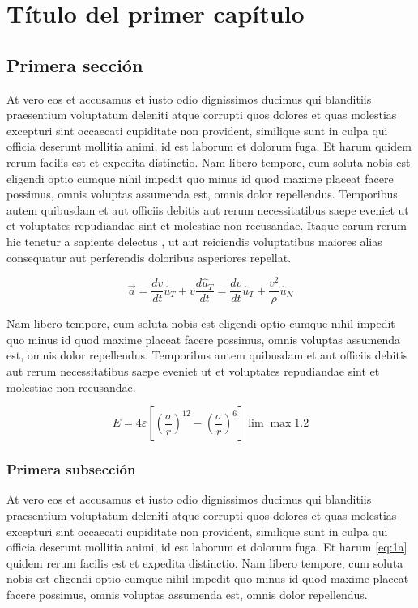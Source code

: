 \chapter{Título del primer capítulo}
\section{Primera sección}
At vero eos et accusamus et iusto odio dignissimos ducimus
qui blanditiis praesentium voluptatum deleniti atque corrupti
quos dolores et quas molestias excepturi sint occaecati cupiditate
non provident, similique sunt in culpa qui officia deserunt mollitia animi,
id est laborum et dolorum fuga. Et harum quidem rerum facilis est et expedita
distinctio. Nam libero tempore, cum soluta nobis est eligendi optio cumque
nihil impedit quo minus id quod maxime placeat facere possimus, omnis voluptas
assumenda est, omnis dolor repellendus. Temporibus autem \cite{Bellomo2000} quibusdam et aut
officiis debitis aut rerum necessitatibus saepe eveniet ut et voluptates
repudiandae sint et molestiae non recusandae. Itaque earum rerum hic
tenetur a sapiente delectus \cite{Arfken2005}, ut aut reiciendis voluptatibus maiores
alias consequatur aut perferendis doloribus asperiores repellat.

\begin{equation}\label{eq:1a}
	\vec {a} = {\frac{{dv}}{{dt}}}\hat {u}_{T} + v{\frac{{d\hat{u}_{T} }}{{dt}}} =
			   {\frac{{dv}}{{dt}}}\hat {u}_{T} + {\frac{{v^{2}}}{{\rho}} }\hat {u}_{N}
\end{equation}

Nam libero tempore, cum soluta nobis est eligendi optio cumque
nihil impedit quo minus id quod maxime placeat facere possimus, omnis voluptas
assumenda est, omnis dolor repellendus. Temporibus autem quibusdam et aut
officiis debitis aut rerum necessitatibus saepe eveniet ut et voluptates
repudiandae sint et molestiae non recusandae.

\begin{equation*}
	E = 4\varepsilon \left[ \left( \frac{\sigma}{r} \right)^{12} -
							\left( \frac{\sigma}{r} \right)^{6} \right]\lim\max 1.2
\end{equation*}

\subsection{Primera subsección}
At vero eos et accusamus et iusto odio dignissimos ducimus
qui blanditiis praesentium voluptatum deleniti atque corrupti
quos dolores et quas molestias excepturi sint occaecati cupiditate
non provident, similique sunt in culpa qui officia deserunt mollitia animi,
id est laborum et dolorum fuga. Et harum \eqref{eq:1a} quidem rerum facilis est et expedita
distinctio. Nam libero tempore, cum soluta nobis est eligendi optio cumque
nihil impedit quo minus id quod maxime placeat facere possimus, omnis voluptas
assumenda est, omnis dolor repellendus.

